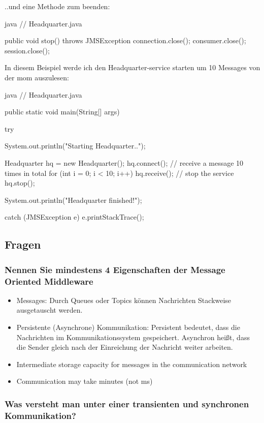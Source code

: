 ..und eine Methode zum beenden:

\begin{code}{java}
// Headquarter.java

public void stop() throws JMSException {
    connection.close();
    consumer.close();
    session.close();
}
\end{code}

In diesem Beispiel werde ich den Headquarter-service starten um 10 Messages von der \gls{mom} auszulesen:

\begin{code}{java}
// Headquarter.java

public static void main(String[] args) {
    try {
        System.out.println("Starting Headquarter..");

        Headquarter hq = new Headquarter();
        hq.connect();
        // receive a message 10 times in total
        for (int i = 0; i < 10; i++) {
            hq.receive();
        }
        // stop the service
        hq.stop();

        System.out.println("Headquarter finished!");
    } catch (JMSException e) {
        e.printStackTrace();
    }
}
\end{code}

\clearpage

\subsection{Fragen}

\subsubsection{Nennen Sie mindestens 4 Eigenschaften der Message Oriented Middleware}
\begin{itemize}
    \item Messages: Durch Queues oder Topics können Nachrichten Stackweise ausgetauscht werden.
    \item Persistente (Asynchrone) Kommunikation: Persistent bedeutet, dass die Nachrichten im Kommunikationssystem gespeichert. Asynchron heißt, dass die Sender gleich nach der Einreichung der Nachricht weiter arbeiten.
    \item Intermediate storage capacity for messages in the communication network
    \item Communication may take minutes (not ms)
\end{itemize}

\subsubsection{Was versteht man unter einer transienten und synchronen Kommunikation?}

